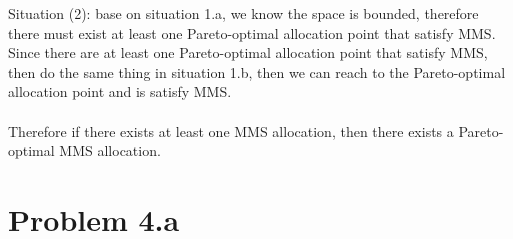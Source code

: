 \documentclass{article}
\begin{document}
Situation (2): base on situation 1.a, we know the space is bounded, therefore there must exist at least one Pareto-optimal allocation point that satisfy MMS.\\
Since there are at least one Pareto-optimal allocation point that satisfy MMS, then do the same thing in situation 1.b, then we can reach to the Pareto-optimal allocation point and is satisfy MMS.\\\\
Therefore if there exists at least one MMS allocation, then there exists a Pareto-optimal
MMS allocation.



\newpage
\section{Problem 4.a}
\end{document}
